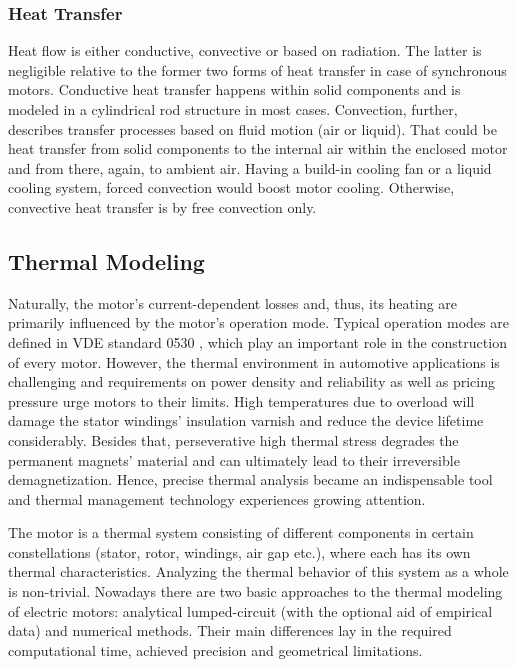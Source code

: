 \subsubsection{Heat Transfer}
Heat flow is either conductive, convective or based on radiation.
The latter is negligible relative to the former two forms of heat transfer in case of synchronous motors.
Conductive heat transfer happens within solid components and is modeled in a cylindrical rod structure in most cases.
Convection, further, describes transfer processes based on fluid motion (air or liquid).
That could be heat transfer from solid components to the internal air within the enclosed motor and from there, again, to ambient air.
Having a build-in cooling fan or a liquid cooling system, forced convection would boost motor cooling.
Otherwise, convective heat transfer is by free convection only.  

\subsection{Thermal Modeling}
\label{ssec:pmsm_thermal_model}
Naturally, the motor's current-dependent losses and, thus, its heating are primarily influenced by the motor's operation mode.
Typical operation modes are defined in VDE standard 0530 \cite{VDE0530}, which play an important role in the construction of every motor.
However, the thermal environment in automotive applications is challenging and requirements on power density and reliability as well as pricing pressure urge motors to their limits.
High temperatures due to overload will damage the stator windings' insulation varnish and reduce the device lifetime considerably.
Besides that, perseverative high thermal stress degrades the permanent magnets' material and can ultimately lead to their irreversible demagnetization.
Hence, precise thermal analysis became an indispensable tool and thermal management technology experiences growing attention.

The motor is a thermal system consisting of different components in certain constellations (stator, rotor, windings, air gap etc.), where each has its own thermal characteristics.
Analyzing the thermal behavior of this system as a whole is non-trivial.
Nowadays there are two basic approaches to the thermal modeling of electric motors: analytical lumped-circuit (with the optional aid of empirical data) and numerical methods.
Their main differences lay in the required computational time, achieved precision and geometrical limitations.

